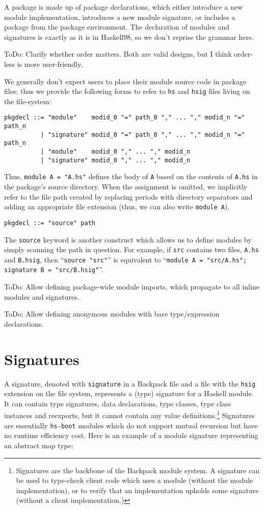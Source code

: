 \documentclass{article}
\newcommand{\Red}[1]{{\color{red} #1}}
\begin{document}
A package is made up of package declarations, which either introduce a
new module implementation, introduces a new module
signature, or includes a package from the package environment.
The declaration of modules and signatures is exactly as it is in Haskell98,
so we don't reprise the grammar here.

\Red{ToDo: Clarify whether order matters.  Both are valid designs, but I think order-less is more user-friendly.}

We generally don't expect users to place their module source code
in package files; thus we provide the following forms to refer to
\verb|hs| and \verb|hsig| files living on the file-system:

\begin{verbatim}
pkgdecl ::= "module"    modid_0 "=" path_0 "," ... "," modid_n "=" path_n
          | "signature" modid_0 "=" path_0 "," ... "," modid_n "=" path_n
          | "module"    modid_0 "," ... "," modid_n
          | "signature" modid_0 "," ... "," modid_n
\end{verbatim}

Thus, \verb|module A = "A.hs"| defines the body of \verb|A| based
on the contents of \verb|A.hs| in the package's source directory.
When the assignment is omitted, we implicitly refer to the file path
created by replacing periods with directory separators and adding
an appropriate file extension (thus, we can also write \verb|module A|).

\begin{verbatim}
pkgdecl ::= "source" path
\end{verbatim}

The \verb|source| keyword is another construct which allows us to
define modules by simply scanning the path in question.  For example,
if \verb|src| contains two files, \verb|A.hs| and \verb|B.hsig|,
then ``\verb|source "src"|'' is equivalent to
``\verb|module A = "src/A.hs"; signature B = "src/B.hsig"|''.

\Red{ToDo: Allow defining package-wide module imports, which propagate to all inline
modules and signatures.}

\Red{ToDo: Allow defining anonymous modules with bare type/expression declarations.}

\section{Signatures}

A signature, denoted with \verb|signature| in a Backpack file and a file
with the \verb|hsig| extension on the file system, represents a (type) signature for a
Haskell module. It can contain type signatures, data declarations, type
classes, type class instances and reexports, but it cannot contain any
value definitions.\footnote{Signatures are the backbone of the Backpack
module system.  A signature can be used to type-check client code which
uses a module (without the module implementation), or to verify that an
implementation upholds some signature (without a client
implementation.)} Signatures are essentially
\texttt{hs-boot} modules which do not support mutual recursion but
have no runtime efficiency cost.  Here is an example of a module signature
representing an abstract map type:
\end{document}
